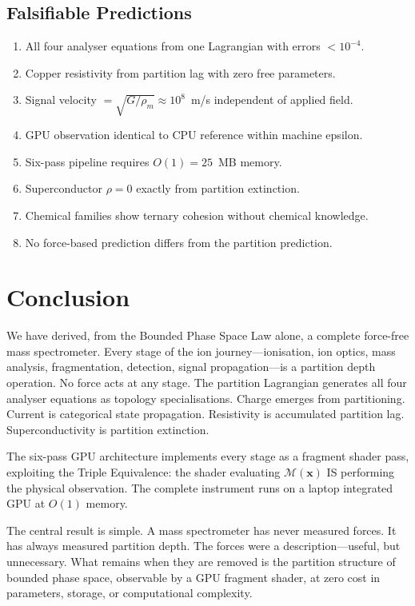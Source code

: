 \documentclass[11pt,twocolumn,a4paper]{article}
\theoremstyle{definition}
\theoremstyle{remark}
\newcommand{\Depth}{\mathcal{M}}
\begin{document}
\subsection{Falsifiable Predictions}

\begin{enumerate}[nosep]
\item All four analyser equations from one Lagrangian with errors $< 10^{-4}$.
\item Copper resistivity from partition lag with zero free parameters.
\item Signal velocity $= \sqrt{G/\rho_m} \approx 10^8$~m/s independent of applied field.
\item GPU observation identical to CPU reference within machine epsilon.
\item Six-pass pipeline requires $O(1) = 25$~MB memory.
\item Superconductor $\rho = 0$ exactly from partition extinction.
\item Chemical families show ternary cohesion without chemical knowledge.
\item No force-based prediction differs from the partition prediction.
\end{enumerate}

\section{Conclusion}
\label{sec:conclusion}

We have derived, from the Bounded Phase Space Law alone, a complete force-free mass spectrometer. Every stage of the ion journey---ionisation, ion optics, mass analysis, fragmentation, detection, signal propagation---is a partition depth operation. No force acts at any stage. The partition Lagrangian generates all four analyser equations as topology specialisations. Charge emerges from partitioning. Current is categorical state propagation. Resistivity is accumulated partition lag. Superconductivity is partition extinction.

The six-pass GPU architecture implements every stage as a fragment shader pass, exploiting the Triple Equivalence: the shader evaluating $\Depth(\mathbf{x})$ IS performing the physical observation. The complete instrument runs on a laptop integrated GPU at $O(1)$ memory.

The central result is simple. A mass spectrometer has never measured forces. It has always measured partition depth. The forces were a description---useful, but unnecessary. What remains when they are removed is the partition structure of bounded phase space, observable by a GPU fragment shader, at zero cost in parameters, storage, or computational complexity.
\end{document}
